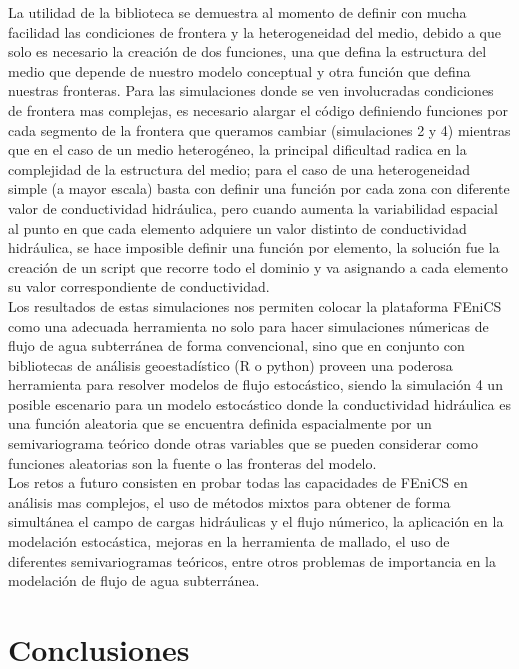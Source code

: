 La utilidad de la biblioteca se demuestra  al momento de definir con mucha facilidad las condiciones de frontera y la heterogeneidad del medio, debido a que solo es necesario la creación de dos funciones, una que defina la estructura del medio que depende de nuestro modelo conceptual y otra función que defina nuestras fronteras. Para las simulaciones donde se ven involucradas condiciones de frontera mas complejas, es necesario alargar el código definiendo funciones por cada segmento de la frontera que queramos cambiar (simulaciones 2 y 4) mientras que en el caso de un medio heterogéneo, la principal dificultad radica en la complejidad de la estructura del medio; para el caso de una heterogeneidad simple (a mayor escala) basta con definir una función por cada zona con diferente valor de conductividad hidráulica, pero cuando aumenta la variabilidad espacial al punto en que cada elemento adquiere un valor distinto de conductividad
hidráulica, se hace imposible definir una función por elemento, la solución fue la creación de un script que recorre todo el dominio y va asignando a cada elemento su valor correspondiente de conductividad. 
\\

Los resultados de estas simulaciones nos permiten colocar la plataforma FEniCS como una adecuada herramienta no solo para hacer simulaciones númericas de flujo de agua subterránea de forma convencional, sino que en conjunto con bibliotecas de análisis geoestadístico (R o python) proveen una poderosa herramienta para resolver modelos de flujo estocástico, siendo la simulación 4 un posible escenario para un modelo estocástico donde la conductividad hidráulica es una función aleatoria que se encuentra definida espacialmente por un semivariograma teórico donde otras variables que se pueden considerar como funciones aleatorias son la fuente o las fronteras del modelo. 
\\

Los retos a futuro consisten en probar todas las capacidades de FEniCS en análisis mas complejos, el uso de métodos mixtos para obtener de forma simultánea el campo de cargas hidráulicas y el flujo númerico, la aplicación en la modelación estocástica, mejoras en la herramienta de mallado, el uso de diferentes semivariogramas teóricos, entre otros problemas de importancia en la modelación de flujo de agua subterránea.     

\chapter*{Conclusiones}

